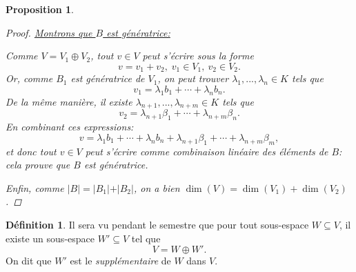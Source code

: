 \documentclass[oneside,12pt,french,table]{book}
\newtheorem{prop}{Proposition}[section]
\theoremstyle{definition}
\theoremstyle{definition}
\theoremstyle{definition}
\newtheorem{definition}{Définition}[chapter]
\begin{document}
\begin{prop}
\begin{proof}
\underline{Montrons que $B$ est génératrice:}
\par Comme $V = V_1 \oplus V_2$, tout $v \in V$ peut s'écrire sous la forme
$$v= v_1 + v_2, \; v_1 \in V_1, \ v_2 \in V_2.$$
Or, comme $B_1$ est génératrice de $V_1$, on peut trouver $\lambda_1,...,\lambda_n \in K$ tels que $$v_1 = \lambda_1 b_1 + \cdots + \lambda_n b_n.$$
De la même manière, il existe $\lambda_{n+1},...,\lambda_{n+m} \in K$ tels que $$v_2 = \lambda_{n+1} \beta_1 + \cdots + \lambda_{n+m} \beta_n.$$
En combinant ces expressions:
$$v = \lambda_1 b_1 + \cdots + \lambda_n b_n + \lambda_{n+1} \beta_1 + \cdots + \lambda_{n+m} \beta_m,$$
et donc tout $v \in V$ peut s'écrire comme combinaison linéaire des éléments de $B$: cela prouve que $B$ est génératrice. \par
Enfin, comme $\vert B \vert = \vert B_1 \vert + \vert B_2 \vert$, on a bien $\dim(V) = \dim(V_1) + \dim(V_2)$.
\end{proof}
\end{prop}
\begin{definition}
Il sera vu pendant le semestre que pour tout sous-espace $W \subseteq V$, il existe un sous-espace $W' \subseteq V$ tel que $$V = W \oplus W'.$$
On dit que $W'$ est le \textit{supplémentaire} de $W$ dans $V$.
\end{definition}
\end{document}
